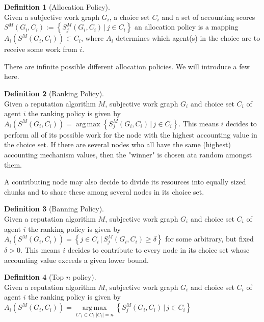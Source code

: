 \documentclass[11pt,a4paper]{article}
\theoremstyle{definition}
\newtheorem{definition}{Definition}[section]
\theoremstyle{theorem}
\theoremstyle{proposition}
\theoremstyle{corollary}
\theoremstyle{lemma}
\theoremstyle{example}
\theoremstyle{remark}
\DeclareMathOperator*{\argmax}{arg\,max}
\begin{document}
\begin{definition}[Allocation Policy]\ \\
Given a subjective work graph $G_i$, a choice set $C_i$ and a set of accounting scores $S^M(G_i,C_i):=\left\lbrace{}S^M_j(G_i,C_i)\,|\,j\in{}C_i\right\rbrace$ an allocation policy is a mapping $A_i(S^M(G_i,C_i))\subset{}C_i$, where $A_i$ determines which agent(s) in the choice are to receive some work from $i$.
\end{definition}

\noindent{}There are infinite possible different allocation policies. We will introduce a few here.

\begin{definition}[Ranking Policy]\ \\
Given a reputation algorithm $M$, subjective work graph $G_i$ and choice set $C_i$ of agent $i$ the ranking policy is given by $A_i(S^M(G_i,C_i))=\argmax{\left\lbrace{}S^M_j(G_i,C_i)\,|\,j\in{}C_i\right\rbrace}$. This means $i$ decides to perform all of its possible work for the node with the highest accounting value in the choice set. If there are several nodes who all have the same (highest) accounting mechanism values, then the "winner" is chosen ata random amongst them.
\end{definition}

\noindent{}A contributing node may also decide to divide its resources into equally sized chunks and to share these among several nodes in its choice set. 

\begin{definition}[Banning Policy]\ \\
Given a reputation algorithm $M$, subjective work graph $G_i$ and choice set $C_i$ of agent $i$ the ranking policy is given by $A_i(S^M(G_i,C_i))=\left\lbrace{}j\in{}C_i\,|\,S^M_j(G_i,C_i)\geq\delta\right\rbrace$ for some arbitrary, but fixed $\delta>0$. This means $i$ decides to contribute to every node in its choice set whose accounting value exceeds a given lower bound. 
\end{definition}

\begin{definition}[Top $n$ policy]\ \\
Given a reputation algorithm $M$, subjective work graph $G_i$ and choice set $C_i$ of agent $i$ the ranking policy is given by $A_i(S^M(G_i,C_i))=\argmax\limits_{C'_i\subset{}C_i \,\, |C_i|=n}{\left\lbrace{}S^M_j(G_i,C_i)\,|\,j\in{}C_i\right\rbrace}$
\end{definition}
\end{document}
